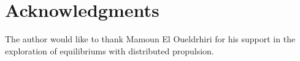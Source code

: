 \documentclass[conf]{new-aiaa} %
\begin{document}
%
%
%
%
%
%



\section*{Acknowledgments}
The author would like to thank Mamoun El Oueldrhiri for his support in the exploration of equilibriums with distributed propulsion.


\end{document}
